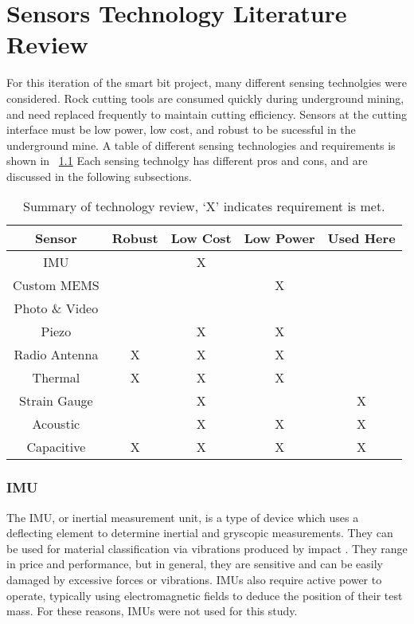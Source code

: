 \chapter{Sensors Technology Literature Review\label{chap:3}}

For this iteration of the smart bit project, many different sensing technolgies were considered.
Rock cutting tools are consumed quickly during underground mining, and need replaced frequently
to maintain cutting efficiency. 
Sensors at the cutting interface must be low power, low cost, and robust 
to be sucessful in the underground mine.
A table of different sensing technologies and requirements is shown in ~\ref{tab:sense_review}
Each sensing technolgy has different pros and cons, and are discussed in the following subsections.


\begin{table}[]
\centering
\caption{Summary of technology review, `X' indicates requirement is met.}
\label{tab:sense_review}
\begin{tabular}{|c|c|c|c|c|}
\hline
Sensor         & Robust & Low Cost & Low Power & Used Here \\ \hline
IMU            &        & X        &           &           \\ \hline
Custom MEMS    &        &          & X         &           \\ \hline
Photo \& Video &        &          &           &           \\ \hline
Piezo          &        & X        & X         &           \\ \hline
Radio Antenna  & X      & X        & X         &           \\ \hline
Thermal        & X      & X        & X         &           \\ \hline
Strain Gauge   &        & X        &           & X         \\ \hline
Acoustic       &        & X        & X         & X         \\ \hline
Capacitive     & X      & X        & X         & X         \\ \hline
\end{tabular}
\end{table}

\subsection{IMU}
The IMU, or inertial measurement unit, is a type of device which uses a deflecting element
to determine inertial and gryscopic measurements. 
They can be used for material classification via vibrations produced by impact \cite{9981139}.
They range in price and performance, but
in general, they are sensitive and can be easily damaged by excessive forces or vibrations.
IMUs also require active power to operate, typically using electromagnetic fields to deduce the 
position of their test mass. For these reasons, IMUs were not used for this study.

